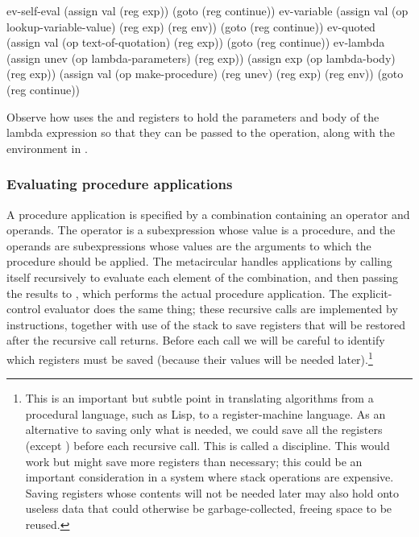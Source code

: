 \begin{codeBlock}
ev-self-eval
  (assign val (reg exp))
  (goto (reg continue))
ev-variable
  (assign val
          (op lookup-variable-value)
          (reg exp)
          (reg env))
  (goto (reg continue))
ev-quoted
  (assign val
          (op text-of-quotation)
          (reg exp))
  (goto (reg continue))
ev-lambda
  (assign unev
          (op lambda-parameters)
          (reg exp))
  (assign exp (op lambda-body) (reg exp))
  (assign val
          (op make-procedure)
          (reg unev)
          (reg exp)
          (reg env))
  (goto (reg continue))
\end{codeBlock}

\noindent
Observe how  uses the  and  registers to
hold the parameters and body of the lambda expression so that they can be
passed to the  operation, along with the environment in
.

\subsubsection*{Evaluating procedure applications}

A procedure application is specified by a combination containing an operator
and operands.  The operator is a subexpression whose value is a procedure, and
the operands are subexpressions whose values are the arguments to which the
procedure should be applied.  The metacircular  handles applications
by calling itself recursively to evaluate each element of the combination, and
then passing the results to , which performs the actual procedure
application.  The explicit-control evaluator does the same thing; these
recursive calls are implemented by  instructions, together with use
of the stack to save registers that will be restored after the recursive call
returns.  Before each call we will be careful to identify which registers must
be saved (because their values will be needed later).\footnote{This is an
important but subtle point in translating algorithms from a procedural
language, such as Lisp, to a register-machine language.  As an alternative to
saving only what is needed, we could save all the registers (except )
before each recursive call. This is called a  discipline.
This would work but might save more registers than necessary; this could be an
important consideration in a system where stack operations are expensive.
Saving registers whose contents will not be needed later may also hold onto
useless data that could otherwise be garbage-collected, freeing space to be
reused.}

